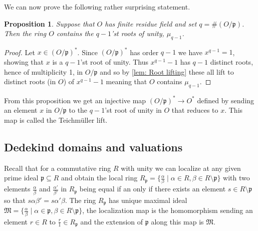 \documentclass{article}
\DeclareMathOperator{\Frac}{Frac}
\newtheorem{definition}{Definition}[section]
\newtheorem{proposition}{Proposition}[section]
\newcommand{\mfrak}[1]{\mathfrak{#1}}
\numberwithin{equation}{section}
\begin{document}
We can now prove the following rather surprising statement.
\begin{proposition} \label{O contains q-1 roots of unity}
    Suppose that $O$ has finite residue field and set $q = \#(O/\mfrak p)$. Then the ring $O$ contains the $q-1$'st roots of unity, $\mu_{q-1}$.
\end{proposition}
\begin{proof}
    Let $x \in (O/\mfrak p)^*$. Since $(O/\mfrak p)^*$ has order $q-1$ we have $x^{q-1} = 1$, showing that $x$ is a $q-1$'st root of unity. Thus $x^{q-1} - 1$ has $q-1$ distinct roots, hence of multiplicity 1, in $O/\mfrak p$ and so by \cref{lem: Root lifting} these all lift to distinct roots (in $O$) of $x^{q-1} - 1$ meaning that $O$ contains $\mu_{q-1}$.
\end{proof}
From this proposition we get an injective map $(O / \mfrak p)^* \to O^*$ defined by sending an element $x$ in $O / \mfrak p$ to the $q-1$'st root of unity in $O$ that reduces to $x$. This map is called the Teichmüller lift. 



\subsection{Dedekind domains and valuations}





Recall that for a commutative ring $R$ with unity we can localize at any given prime ideal $\mfrak p \subseteq R$ and obtain the local ring $R_\mfrak p = \{\frac{\alpha}{\beta} \mid \alpha \in R, \beta \in R \setminus \mfrak p \}$ with two elements $\frac{\alpha}{\beta}$ and  $\frac{\alpha'}{\beta'}$ in $R_\mfrak p$ being equal if an only if there exists an element $s \in R \setminus \mfrak p$ so that $s\alpha \beta' = s\alpha' \beta$. The ring $R_\mfrak p$ has unique maximal ideal $\mfrak M =  \{\frac{\alpha}{\beta} \mid \alpha \in \mfrak p, \beta \in R\setminus \mfrak p \}$, the localization map is the homomorphism sending an element $r \in R$ to $\frac{r}{1} \in R_\mfrak p$ and the extension of $\mfrak p$ along this map is $\mfrak M$.
\end{document}
